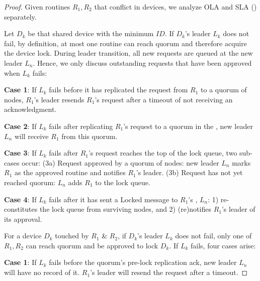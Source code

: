 \begin{proof}
\label{comesh:theorem:safety:proof}
Given routines $R_1, R_2$ that conflict in devices, we analyze OLA and SLA () separately. 

\label{comesh:theorem:safety:sla:proof}
Let $D_k$ be that shared device with the minimum $ID$. If $D_k$'s \kgroup{} leader $L_k$ does not fail, by definition, at most one routine can reach quorum
and therefore acquire the device lock.
During leader transition, all new requests are queued at the new leader $L_n$. Hence, we only discuss outstanding requests that have been approved when $L_k$ fails: 



\label{comesh:theorem:safety:sla:case1}
\noindent \textbf{Case 1}: If $L_k$ fails before it has replicated the request
from $R_1$ to a quorum of \kgroup{} nodes,
$R_1$'s \kgroup{} leader resends $R_1$'s request after a timeout %
of not receiving an acknowledgment.

\label{comesh:theorem:safety:sla:case2}
\noindent \textbf{Case 2}: If $L_k$ fails after replicating $R_1$'s request to a quorum in the \kgroup{},
new leader $L_n$ will receive $R_1$ from this  quorum. 

\label{comesh:theorem:safety:sla:case3}
\noindent \textbf{Case 3}: If $L_k$ fails after $R_1$'s request reaches the top of the lock queue,
two sub-cases occur: (3a) Request approved by a quorum of nodes: 
new leader $L_n$ marks $R_1$ as the approved routine and notifies $R_1$'s \kgroup{} leader.
(3b) Request has not yet reached quorum:
$L_n$ adds $R_1$ to the lock queue.

\label{comesh:theorem:safety:sla:case4}
\noindent \textbf{Case 4}: If $L_k$ fails after it has sent a Locked message to $R_1$'s \kgroup,
 $L_n$: 1) re-constitutes the lock queue from  surviving nodes,
and 2) (re)notifies $R_1$'s \kgroup{} leader of its approval.

{

\label{comesh:theorem:safety:ola:proof}
For a device $D_k$ touched by  $R_1$ \&  $R_2$, if $D_k$'s  \kgroup{}
leader $L_k$ does not fail, only one of $R_1, R_2$ can reach quorum and be approved to lock $D_k$. 
%
If $L_k$ fails, four cases arise:

\label{comesh:theorem:safety:ola:case1}
\noindent \textbf{Case 1}: If $L_k$ fails before the quorum's pre-lock replication ack, new leader $L_n$ will have no record of it.  $R_1$'s \kgroup{} leader will resend the request after a timeout.


}
\end{proof}

